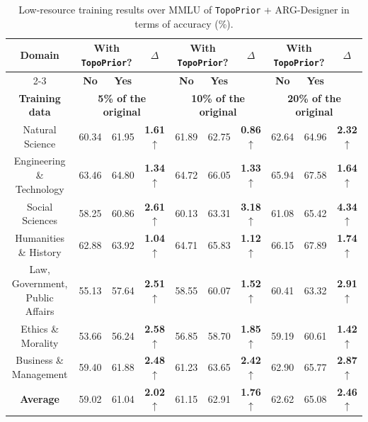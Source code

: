 \documentclass[lettersize,journal]{IEEEtran}
\theoremstyle{plain}
\begin{document}
\begin{table}[!t]
\centering
\caption{Low-resource training results over MMLU of \texttt{TopoPrior} + ARG-Designer in terms of accuracy (\%).}
\begin{tabular}{cccccccccc}
\toprule
\multirow{2}{*}{\textbf{Domain}} & 
\multicolumn{2}{c}{\textbf{With \texttt{TopoPrior}?}} & 
\multirow{2}{*}{$\Delta$} & 
\multicolumn{2}{c}{\textbf{With \texttt{TopoPrior}?}} & 
\multirow{2}{*}{$\Delta$} & 
\multicolumn{2}{c}{\textbf{With \texttt{TopoPrior}?}} & 
\multirow{2}{*}{$\Delta$} \\
\cline{2-3} \cline{5-6} \cline{8-9}
& \textbf{No} & \textbf{Yes} & & \textbf{No} & \textbf{Yes} & & \textbf{No} & \textbf{Yes} & \\ \midrule
\multicolumn{1}{c}{\multirow{1}{*}{\textbf{Training data}}} & 
\multicolumn{3}{c}{\textbf{5\% of the original}} & 
\multicolumn{3}{c}{\textbf{10\% of the original}} & 
\multicolumn{3}{c}{\textbf{20\% of the original}} \\ \midrule
Natural Science & 60.34 & 61.95 & \textbf{1.61$\uparrow$} & 61.89 & 62.75 & \textbf{0.86$\uparrow$} & 62.64 & 64.96 & \textbf{2.32$\uparrow$} \\
Engineering \& Technology & 63.46 & 64.80 & \textbf{1.34$\uparrow$} & 64.72 & 66.05 & \textbf{1.33$\uparrow$} & 65.94 & 67.58 & \textbf{1.64$\uparrow$} \\
Social Sciences & 58.25 & 60.86 & \textbf{2.61$\uparrow$} & 60.13 & 63.31 & \textbf{3.18$\uparrow$} & 61.08 & 65.42 & \textbf{4.34$\uparrow$} \\
Humanities \& History & 62.88 & 63.92 & \textbf{1.04$\uparrow$} & 64.71 & 65.83 & \textbf{1.12$\uparrow$} & 66.15 & 67.89 & \textbf{1.74$\uparrow$} \\
Law, Government, Public Affairs & 55.13 & 57.64 & \textbf{2.51$\uparrow$} & 58.55 & 60.07 & \textbf{1.52$\uparrow$} & 60.41 & 63.32 & \textbf{2.91$\uparrow$} \\
Ethics \& Morality & 53.66 & 56.24 & \textbf{2.58$\uparrow$} & 56.85 & 58.70 & \textbf{1.85$\uparrow$} & 59.19 & 60.61 & \textbf{1.42$\uparrow$} \\
Business \& Management & 59.40 & 61.88 & \textbf{2.48$\uparrow$} & 61.23 & 63.65 & \textbf{2.42$\uparrow$} & 62.90 & 65.77 & \textbf{2.87$\uparrow$} \\
\midrule
\textbf{Average} & 59.02 & 61.04 & \textbf{2.02$\uparrow$} & 61.15 & 62.91 & \textbf{1.76$\uparrow$} & 62.62 & 65.08 & \textbf{2.46$\uparrow$} \\
\bottomrule
\end{tabular}
\label{few_shot}
\vspace{-1em}
\end{table}
\end{document}
